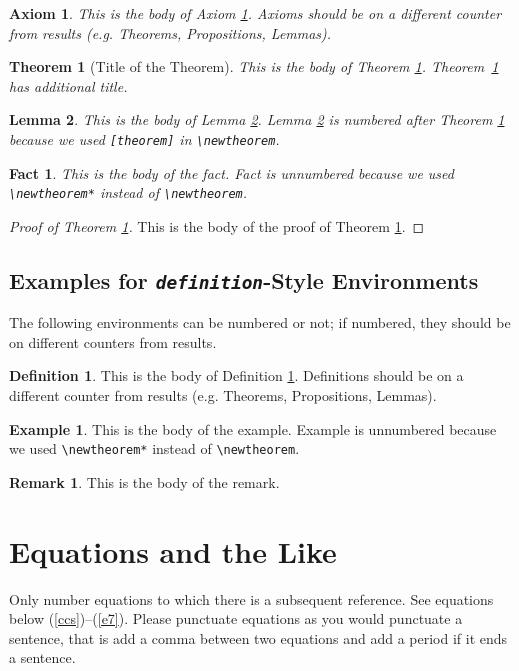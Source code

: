 \documentclass[te,nameyear,final,supplement]{econsocart}
\theoremstyle{plain}
\newtheorem{axiom}{Axiom}
\newtheorem{theorem}{Theorem}
\newtheorem{lemma}[theorem]{Lemma}
\newtheorem*{fact}{Fact}
\theoremstyle{definition}
\newtheorem{definition}{Definition}
\newtheorem*{example}{Example}
\newtheorem{remark}{Remark}
\begin{document}
\begin{axiom}\label{ax1}
This is the body of Axiom \ref{ax1}. Axioms should be on a different counter from results (e.g. Theorems, Propositions, Lemmas).
\end{axiom}

\begin{theorem}[Title of the Theorem]\label{th2}
This is the body of Theorem \ref{th2}. Theorem~\ref{th2} has additional title.
\end{theorem}

\begin{lemma}\label{le1}
This is the body of Lemma \ref{le1}. Lemma \ref{le1} is numbered after
Theorem \ref{th2} because we used \verb|[theorem]| in \verb|\newtheorem|.
\end{lemma}

\begin{fact}
This is the body of the fact. Fact is unnumbered because we used \verb|\newtheorem*|
instead of \verb|\newtheorem|.
\end{fact}

\begin{proof}[Proof of Theorem \ref{th2}]
This is the body of the proof of Theorem \ref{th2}.
\end{proof}


\subsection{Examples for \emph{\texttt{definition}}-Style Environments}


The following environments can be numbered or not; if numbered, they should be on different counters from results.

\begin{definition}\label{de1}
This is the body of Definition \ref{de1}. Definitions should be on a different counter from results (e.g. Theorems, Propositions, Lemmas).
\end{definition}

\begin{example}
This is the body of the example. Example is unnumbered because we used \verb|\newtheorem*|
instead of \verb|\newtheorem|.
\end{example}

\begin{remark}
This is the body of the remark. 
\end{remark}

\section{Equations and the Like}
Only number equations to which there is a subsequent reference.
See equations below (\ref{ccs})--(\ref{e7}). Please punctuate equations as you would punctuate a sentence, that is add a comma between two equations and add a period if it ends a sentence.
\end{document}
